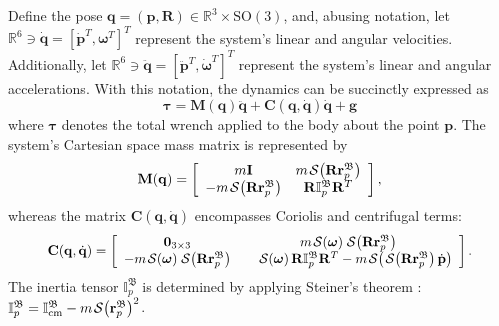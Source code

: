 Define the pose $\mathbf{q} = (\mathbf{p}, \mathbf{R}) \in \mathbb{R}^3\times \text{SO}(3)$, and, abusing notation, let $\mathbb{R}^6\ni\dot{\mathbf{q}} = \left[\dot{\mathbf{p}}^T, \boldsymbol{\omega}^T \right]^T$ represent the system's linear and angular velocities. Additionally, let $\mathbb{R}^6\ni\ddot{\mathbf{q}} = \left[\ddot{\mathbf{p}}^T, \dot{\boldsymbol{\omega}}^T \right]^T$ represent the system's linear and angular accelerations.
With this notation, the dynamics can be succinctly expressed as
\begin{equation}
    \boldsymbol{\tau } = \mathbf {M}(\mathbf {q})\ddot{\mathbf {q}} + \mathbf {C}(\mathbf {q},\dot{\mathbf {q}})\dot{\mathbf {q}} + \mathbf{g}\label{eq:tau}
\end{equation}
where $\boldsymbol{\tau }$ denotes the total wrench applied to the body about the point $\mathbf{p}$. The system's Cartesian space mass matrix is represented by
\begin{equation}
    \mathbf {M}(\mathbf {q}) = \left[\begin{array}{cc}m\mathbf {I} & m\SL[\mathbf {R} \mathbf {r}_p^\mathfrak{B}] \\ -m\SL[\mathbf {R} \mathbf {r}_p^\mathfrak{B}] & \mathbf {R} \mathbb{I}^\mathfrak{B}_p \mathbf {R}^T \end{array} \right],\label{eq:Mcartesian}
\end{equation}
whereas the matrix $\mathbf {C}(\mathbf {q},\dot{\mathbf {q}})$ encompasses Coriolis and centrifugal terms:
\begin{equation}
\resizebox{0.88\columnwidth}{!}{$%
    \mathbf {C}(\mathbf {q},\dot{\mathbf {q}}) = \left[\begin{array}{cc}\boldsymbol{0}_{3\times3} & m\SL[\boldsymbol{\omega }] \SL[\mathbf {R} \mathbf {r}_p^\mathfrak{B}] \\ -m\SL[\boldsymbol{\omega }]\SL[\mathbf {R} \mathbf {r}_p^\mathfrak{B}] & \quad\SL[\boldsymbol{\omega }] \mathbf {R}\mathbb{I}_p^\mathfrak{B}\mathbf {R}^T 
    -m\SL[\SL[\mathbf {R}\mathbf {r}_p^\mathfrak{B}] \dot{\mathbf{p}}] \end{array} \right]. \label{eq:C}
$%
}
\end{equation}
The inertia tensor \(\mathbb{I}_p^\mathfrak{B}\) is determined by applying Steiner's theorem \citep{lemos2018analytical}: \(\mathbb{I}_p^\mathfrak{B} = \mathbb{I}_\text{cm}^\mathfrak{B} - m\SL[\mathbf{r}_p^\mathfrak{B}]^2\).

